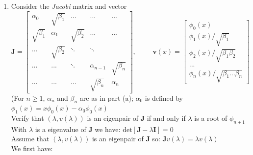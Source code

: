 \documentclass[14pt,a4paper]{article}
\begin{document}
\begin{enumerate}
	\label{3b}
	\item Consider the \textit{Jacobi} matrix and vector \\
	\hspace*{1cm} $ \textbf{J} = \begin{bmatrix} \alpha_0 & \sqrt{\beta_1} & ... & ... & ... \\ \sqrt{\beta_1} & \alpha_1 & \sqrt{\beta_2} & ... & ... \\ ... & \sqrt{\beta_2} & \ddots & \ddots \\ ... & ... & \ddots & \alpha_{n-1} & \sqrt{\beta_n} \\ ... & ... & ... & \sqrt{\beta_n} & \alpha_n \end{bmatrix},  \hspace{1cm} \textbf{v}(x) = \begin{bmatrix} \phi_0(x) \\ \phi_1(x)/\sqrt{\beta_1} \\ \phi_2(x)/\sqrt{\beta_1\beta_2} \\ ... \\ \phi_n(x)/\sqrt{\beta_1...\beta_n} \end{bmatrix}$ \\
	(For $n \geq 1$, $\alpha_n$ and $\beta_n$ are as in part (a); $\alpha_0$ is defined by $\phi_1(x) = x\phi_0(x) - \alpha_0\phi_0(x)$ \\
	Verify that $(\lambda,v(\lambda))$ is an eigenpair of \textbf{J} if and only if $\lambda$ is a root of $\phi_{n+1}$ \\ 
	With $\lambda$ is a eigenvalue of \textbf{J} we have: $\mathrm{det}[\textbf{J} - \lambda\textbf{I}] =0$\\
	Assume that $(\lambda,v(\lambda))$ is an eigenpair of \textbf{J} so: $\textbf{J}v(\lambda) = \lambda v(\lambda)$\\ 
	We first have:

\end{enumerate}
\end{document}
